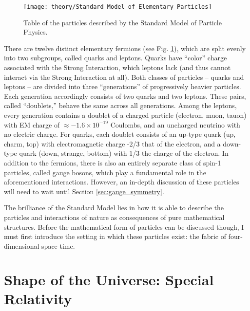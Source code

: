     \begin{figure}[h!]
        \texttt{[image: theory/Standard\_Model\_of\_Elementary\_Particles]}
        \caption{
            Table of the particles described by the Standard Model of Particle Physics\cite{wikimedia_sm}.
        }
        \label{fig:sm_particles}
    \end{figure}

    There are twelve distinct elementary fermions (see Fig. \ref{fig:sm_particles}),
        which are split evenly into two subgroups, called quarks and leptons.
    Quarks have ``color'' charge associated with the Strong Interaction,
        which leptons lack (and thus cannot interact via the Strong Interaction at all).
    Both classes of particles -- quarks and leptons -- are divided into three ``generations'' of progressively heavier particles.
    Each generation accordingly consists of two quarks and two leptons.
    These pairs, called ``doublets,'' behave the same across all generations.
    Among the leptons, every generation contains a doublet of a charged particle (electron, muon, tauon)
        with EM charge of $\approx −1.6 \times 10^{-19}$ Coulombs,
        and an uncharged neutrino with no electric charge.
    For quarks, each doublet consists of an up-type quark (up, charm, top) with electromagnetic charge -2/3 that of the electron,
        and a down-type quark (down, strange, bottom) with 1/3 the charge of the electron.
    In addition to the fermions, there is also an entirely separate class of spin-1 particles, called gauge bosons,
        which play a fundamental role in the aforementioned interactions.
    However, an in-depth discussion of these particles will need to wait until Section \ref{sec:gauge_symmetry}.

    The brilliance of the Standard Model lies in how it is able to describe the 
        particles and interactions of nature as consequences of pure mathematical structures.
    Before the mathematical form of particles can be discussed though,
        I must first introduce the setting in which these particles exist:
        the fabric of four-dimensional space-time.


\FloatBarrier
\section{Shape of the Universe: Special Relativity}

